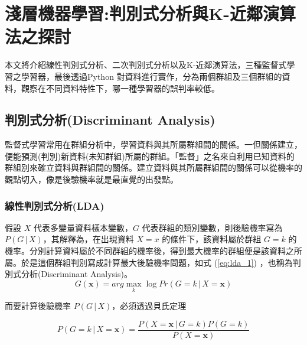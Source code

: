 %   
%

\chapter{淺層機器學習:判別式分析與K-近鄰演算法之探討}
本文將介紹線性判別式分析、二次判別式分析以及K-近鄰演算法，三種監督式學習之學習器，最後透過Python 對資料進行實作，分為兩個群組及三個群組的資料，觀察在不同資料特性下，哪一種學習器的誤判率較低。

\section{判別式分析(Discriminant Analysis)}

監督式學習常用在群組分析中，學習資料與其所屬群組間的關係。一但關係建立，便能預測(判別)新資料(未知群組)所屬的群組。「監督」之名來自利用已知資料的群組別來確立資料與群組間的關係。建立資料與其所屬群組間的關係可以從機率的觀點切入，像是後驗機率就是最直覺的出發點。

\subsection{線性判別式分析(LDA)}

假設 $X$ 代表多變量資料樣本變數，$G$ 代表群組的類別變數，則後驗機率寫為 $P(G\,|\,X)$，其解釋為，在出現資料 $X = x$ 的條件下，該資料屬於群組 $G = k$ 的機率。分別計算資料屬於不同群組的機率後，得到最大機率的群組便是該資料之所屬。於是這個群組判別寫成計算最大後驗機率問題，如式 (\ref{eq:lda_1}) ，也稱為判別式分析(Discriminant Analysis)。
\begin{equation}\label{eq:lda_1}
G(\mathbf{x}) = arg\mathop{max} \limits_k \log Pr(G = k\,|\,X = \mathbf{x})
\end{equation}

而要計算後驗機率 $P(G\,|\,X)$，必須透過貝氏定理

\begin{equation}\label{eq:lda_2}
\displaystyle P(G = k\,|\,X = \mathbf{x}) = \frac{P(X = \mathbf{x}\,|\,G = k)P(G = k)}{P(X = \mathbf{x})}
\end{equation}

